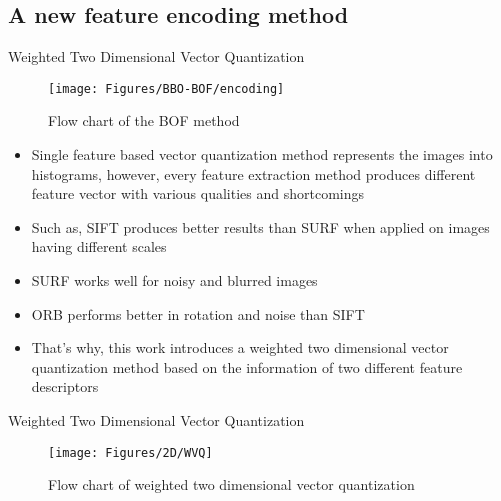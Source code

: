 \documentclass [9pt,times] {beamer}
\begin{document}
\subsection{A new feature encoding method}


\begin{frame}{Weighted Two Dimensional Vector Quantization}

\begin{figure}[t]
			\centering
			\texttt{[image: Figures/BBO-BOF/encoding]}
			\caption{{\scriptsize Flow chart of the BOF method}}\label{fig:emp}
\end{figure}


\begin{itemize}
\justifying
\fontsize{7pt}{9pt}\selectfont
\item Single feature based vector quantization method represents the images into histograms, however, every feature extraction method produces different feature vector with various qualities and shortcomings \\[3ex]

\item Such as, SIFT produces better results than SURF when applied on images having different scales \cite{panchal2013} \\[3ex]

\item SURF works well for noisy and blurred images \cite{panchal2013} \\[3ex]

\item ORB performs better in rotation and noise than SIFT \cite{Karami2017} \\[3ex]

\item That's why, this work introduces a weighted two dimensional vector quantization method based on the information of two different feature descriptors


\end{itemize}
\end{frame}


\begin{frame}{Weighted Two Dimensional Vector Quantization}




\begin{figure}[t]
			\centering
			\texttt{[image: Figures/2D/WVQ]}
			\caption{{\scriptsize Flow chart of weighted two dimensional vector quantization}}\label{fig:emp}
\end{figure}

\end{frame}
\end{document}
